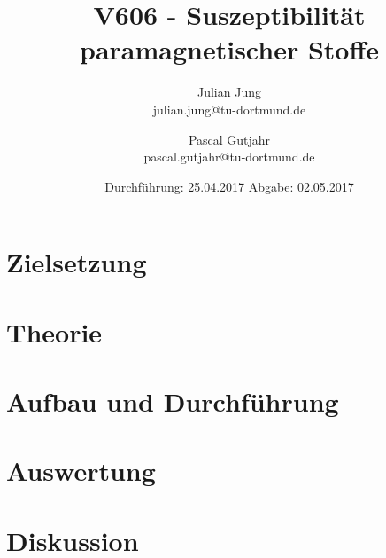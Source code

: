 

\title{V606 - Suszeptibilität paramagnetischer Stoffe}
\author{Julian Jung \\ julian.jung@tu-dortmund.de
  \and Pascal Gutjahr \\ pascal.gutjahr@tu-dortmund.de}
  \date{Durchführung: 25.04.2017
  \hspace{3em}
  Abgabe: 02.05.2017}
  
\maketitle
\newpage
\tableofcontents
\newpage
\section{Zielsetzung}
\section{Theorie}
\section{Aufbau und Durchführung}
\section{Auswertung}
\section{Diskussion}
% 
\printbibliography

